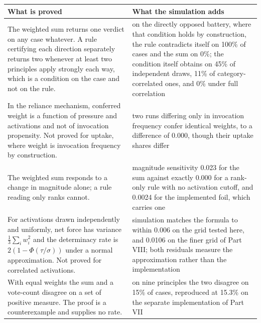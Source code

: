 \begin{tabular}{p{} p{}}
\toprule
\textbf{What is proved} & \textbf{What the simulation adds} \\
\midrule
The weighted sum returns one verdict on any case whatever. A rule certifying each direction separately returns two whenever at least two principles apply strongly each way, which is a condition on the case and not on the rule. & on the directly opposed battery, where that condition holds by construction, the rule contradicts itself on 100\% of cases and the sum on 0\%; the condition itself obtains on 45\% of independent draws, 11\% of category-correlated ones, and 0\% under full correlation \\
\addlinespace
In the reliance mechanism, conferred weight is a function of pressure and activations and not of invocation propensity. Not proved for uptake, where weight is invocation frequency by construction. & two runs differing only in invocation frequency confer identical weights, to a difference of 0.000, though their uptake shares differ \\
\addlinespace
The weighted sum responds to a change in magnitude alone; a rule reading only ranks cannot. & magnitude sensitivity 0.023 for the sum against exactly 0.000 for a rank-only rule with no activation cutoff, and 0.0024 for the implemented foil, which carries one \\
\addlinespace
For activations drawn independently and uniformly, net force has variance $\tfrac{1}{3}\sum_i w_i^2$ and the determinacy rate is $2(1-\Phi(\tau/\sigma))$ under a normal approximation. Not proved for correlated activations. & simulation matches the formula to within 0.006 on the grid tested here, and 0.0106 on the finer grid of Part VIII; both residuals measure the approximation rather than the implementation \\
\addlinespace
With equal weights the sum and a vote-count disagree on a set of positive measure. The proof is a counterexample and supplies no rate. & on nine principles the two disagree on 15\% of cases, reproduced at 15.3\% on the separate implementation of Part VII \\
\bottomrule
\end{tabular}

